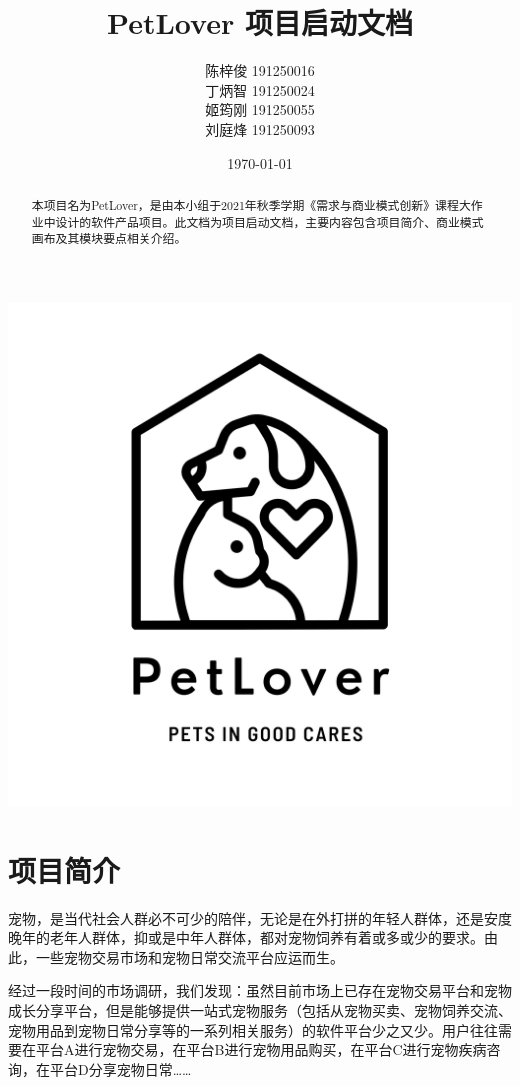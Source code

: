 \documentclass[a4paper]{ctexart}
\title{\Huge PetLover 项目启动文档}
\author{
  陈梓俊 191250016\\
  丁炳智 191250024\\
  姬筠刚 191250055\\
  刘庭烽 191250093\\
}
\date{\today}
\begin{document}
\maketitle

\centerline{\includegraphics[]{logo.png}}

\newpage

\begin{abstract}
  本项目名为PetLover，是由本小组于2021年秋季学期《需求与商业模式创新》课程大作业中设计的软件产品项目。此文档为项目启动文档，主要内容包含项目简介、商业模式画布及其模块要点相关介绍。
\end{abstract}



\tableofcontents

\newpage

\setlength{\parskip}{1em}


\section{项目简介}
宠物，是当代社会人群必不可少的陪伴，无论是在外打拼的年轻人群体，还是安度晚年的老年人群体，抑或是中年人群体，都对宠物饲养有着或多或少的要求。由此，一些宠物交易市场和宠物日常交流平台应运而生。

经过一段时间的市场调研，我们发现：虽然目前市场上已存在宠物交易平台和宠物成长分享平台，但是能够提供一站式宠物服务（包括从宠物买卖、宠物饲养交流、宠物用品到宠物日常分享等的一系列相关服务）的软件平台少之又少。用户往往需要在平台A进行宠物交易，在平台B进行宠物用品购买，在平台C进行宠物疾病咨询，在平台D分享宠物日常……
\end{document}
